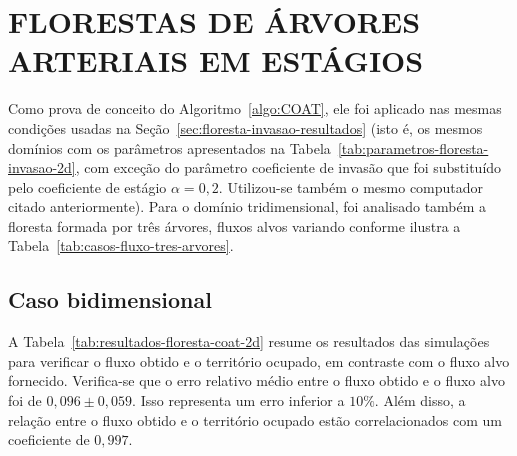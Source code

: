 \begin{figure}[!htb]

  \label{fig:diametro-medio-floresta-com-coeficiente-de-invasao-caso-3arvores-3d-parte5}
\end{figure}

\section{FLORESTAS DE ÁRVORES ARTERIAIS EM ESTÁGIOS}\label{sec:coat-resultados}

Como prova de conceito do Algoritmo~\ref{algo:COAT}, 
ele foi aplicado nas mesmas condições usadas na Seção~\ref{sec:floresta-invasao-resultados} 
(isto é, os mesmos domínios com os parâmetros apresentados na 
Tabela~\ref{tab:parametros-floresta-invasao-2d}, com exceção do parâmetro 
coeficiente de invasão que foi substituído pelo coeficiente de estágio $\alpha = 0,2$.
Utilizou-se também o mesmo computador citado anteriormente).
Para o domínio tridimensional, foi analisado também a floresta formada por 
três árvores, fluxos alvos variando conforme ilustra a Tabela~\ref{tab:casos-fluxo-tres-arvores}.

\subsection{Caso bidimensional}\label{sec:coat-floresta-caso-2d}

A Tabela~\ref{tab:resultados-floresta-coat-2d} resume os resultados
das simulações para verificar o fluxo obtido e o território ocupado, em contraste com o 
fluxo alvo fornecido.
Verifica-se que o erro relativo médio entre o fluxo obtido e o fluxo alvo foi 
de $0,096 \pm 0,059$. Isso representa um erro inferior a $10\%$. 
Além disso, a relação entre o fluxo obtido e o território ocupado estão correlacionados com um
coeficiente de $0,997$. 

